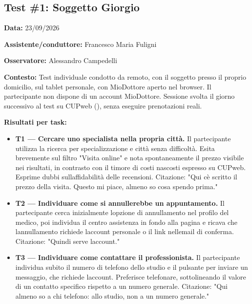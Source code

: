 \subsection{Test \#1: Soggetto Giorgio}

\textbf{Data:} 23/09/2026

\textbf{Assistente/conduttore:} Francesco Maria Fuligni

\textbf{Osservatore:} Alessandro Campedelli

\textbf{Contesto:} Test individuale condotto da remoto, con il
soggetto presso il proprio domicilio, sul tablet personale, con
MioDottore aperto nel browser. Il partecipante non dispone di un
account MioDottore. Sessione svolta il giorno successivo al test su
CUPweb (), senza eseguire prenotazioni reali.

\textbf{Risultati per task:}

\begin{itemize}
\item
  \textbf{T1 --- Cercare uno specialista nella propria città.}
  Il partecipante utilizza la
  ricerca per specializzazione e città senza difficoltà. Esita
  brevemente sul filtro "Visita online" e nota spontaneamente il
  prezzo visibile nei risultati, in contrasto con il timore di costi
  nascosti espresso su CUPweb. Esprime dubbi sull\textquotesingle affidabilità
  delle recensioni. Citazione: "Qui c\textquotesingle è scritto il
  prezzo della visita. Questo mi piace, almeno so cosa spendo prima."
\item
  \textbf{T2 --- Individuare come si annullerebbe un appuntamento.}
  Il partecipante cerca
  inizialmente l\textquotesingle opzione di annullamento nel profilo
  del medico, poi individua il centro assistenza in fondo alla pagina
  e ricava che l\textquotesingle annullamento richiede l\textquotesingle account
  personale o il link nell\textquotesingle email di conferma.
  Citazione: "Quindi serve l\textquotesingle account."
\item
  \textbf{T3 --- Individuare come contattare il professionista.}
  Il partecipante individua
  subito il numero di telefono dello studio e il pulsante per inviare
  un messaggio, che richiede l\textquotesingle account. Preferisce
  telefonare, sottolineando il valore di un contatto specifico
  rispetto a un numero generale. Citazione: "Qui almeno so a chi
  telefono: allo studio, non a un numero generale."
\end{itemize}

